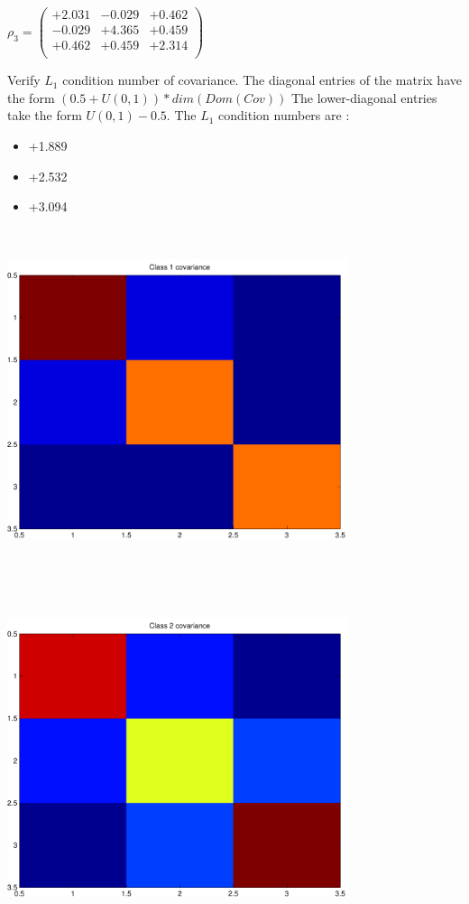 \documentclass[9pt]{article}
\theoremstyle{plain}
\theoremstyle{definition}
\theoremstyle{remark}
\numberwithin{equation}{section}
\begin{document}
$\rho_3 = \left(
\begin{array}{
ccc}
+2.031 & -0.029 & +0.462 \\
-0.029 & +4.365 & +0.459 \\
+0.462 & +0.459 & +2.314 \\
\end{array}
\right)$ \newline 

Verify $L_1$ condition number of covariance. The diagonal entries of the matrix have the form $(0.5 + U(0,1) )*dim(Dom(Cov))$
The lower-diagonal entries take the form $U(0,1) - 0.5$. 
The $L_1$ condition numbers are :
\begin{itemize}
\item +1.889
\item +2.532
\item +3.094
\end{itemize}
\includegraphics[width=10.0cm,height=10.0cm]{rv1_corr.pdf}

\includegraphics[width=10.0cm,height=10.0cm]{rv2_corr.pdf}
\end{document}
